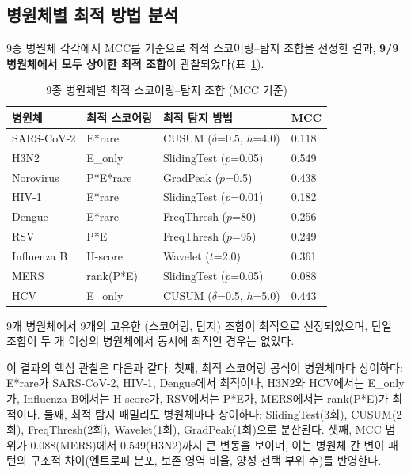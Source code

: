 \subsection{병원체별 최적 방법 분석}
\label{subsec:9pathogen_best_combos}


9종 병원체 각각에서 MCC를 기준으로 최적 스코어링--탐지 조합을 선정한 결과, \textbf{9/9 병원체에서 모두 상이한 최적 조합}이 관찰되었다(표~\ref{tab:9pathogen_best}).

\begin{table}[htbp]
\centering
\caption{9종 병원체별 최적 스코어링--탐지 조합 (MCC 기준)}
\label{tab:9pathogen_best}
\small
\begin{tabular}{llll}
\toprule
\textbf{병원체} & \textbf{최적 스코어링} & \textbf{최적 탐지 방법} & \textbf{MCC} \\
\midrule
SARS-CoV-2 & E*rare & CUSUM ($\delta$=0.5, $h$=4.0) & 0.118 \\
H3N2 & E\_only & SlidingTest ($p$=0.05) & 0.549 \\
Norovirus & P*E*rare & GradPeak ($p$=0.5) & 0.438 \\
HIV-1 & E*rare & SlidingTest ($p$=0.01) & 0.182 \\
Dengue & E*rare & FreqThresh ($p$=80) & 0.256 \\
RSV & P*E & FreqThresh ($p$=95) & 0.249 \\
Influenza B & H-score & Wavelet ($t$=2.0) & 0.361 \\
MERS & rank(P*E) & SlidingTest ($p$=0.05) & 0.088 \\
HCV & E\_only & CUSUM ($\delta$=0.5, $h$=5.0) & 0.443 \\
\bottomrule
\end{tabular}
\begin{minipage}{\textwidth}
\smallskip
\footnotesize 9개 병원체에서 9개의 고유한 (스코어링, 탐지) 조합이 최적으로 선정되었으며, 단일 조합이 두 개 이상의 병원체에서 동시에 최적인 경우는 없었다.
\end{minipage}
\end{table}

이 결과의 핵심 관찰은 다음과 같다.
첫째, 최적 스코어링 공식이 병원체마다 상이하다: E*rare가 SARS-CoV-2, HIV-1, Dengue에서 최적이나, H3N2와 HCV에서는 E\_only가, Influenza B에서는 H-score가, RSV에서는 P*E가, MERS에서는 rank(P*E)가 최적이다.
둘째, 최적 탐지 패밀리도 병원체마다 상이하다: SlidingTest(3회), CUSUM(2회), FreqThresh(2회), Wavelet(1회), GradPeak(1회)으로 분산된다.
셋째, MCC 범위가 0.088(MERS)에서 0.549(H3N2)까지 큰 변동을 보이며, 이는 병원체 간 변이 패턴의 구조적 차이(엔트로피 분포, 보존 영역 비율, 양성 선택 부위 수)를 반영한다.


